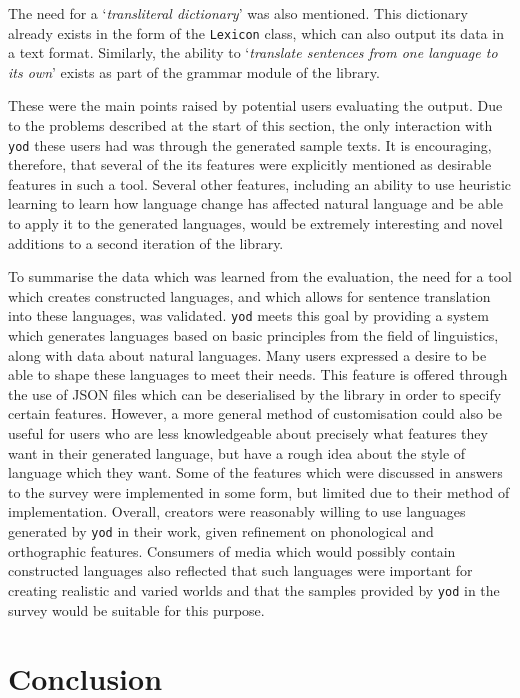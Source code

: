 \documentclass{report}
\begin{document}
	The need for a `\textit{transliteral dictionary}' was also mentioned. This dictionary already exists in the form of the \texttt{Lexicon} class, which can also output its data in a text format. Similarly, the ability to `\textit{translate sentences from one language to its own}' exists as part of the grammar module of the library.
	
	These were the main points raised by potential users evaluating the output. Due to the problems described at the start of this section, the only interaction with \texttt{yod} these users had was through the generated sample texts. It is encouraging, therefore, that several of the its features were explicitly mentioned as desirable features in such a tool. Several other features, including an ability to use heuristic learning to learn how language change has affected natural language and be able to apply it to the generated languages, would be extremely interesting and novel additions to a second iteration of the library.
	
	To summarise the data which was learned from the evaluation, the need for a tool which creates constructed languages, and which allows for sentence translation into these languages, was validated. \texttt{yod} meets this goal by providing a system which generates languages based on basic principles from the field of linguistics, along with data about natural languages. Many users expressed a desire to be able to shape these languages to meet their needs. This feature is offered through the use of JSON files which can be deserialised by the library in order to specify certain features. However, a more general method of customisation could also be useful for users who are less knowledgeable about precisely what features they want in their generated language, but have a rough idea about the style of language which they want. Some of the features which were discussed in answers to the survey were implemented in some form, but limited due to their method of implementation. Overall, creators were reasonably willing to use languages generated by \texttt{yod} in their work, given refinement on phonological and orthographic features. Consumers of media which would possibly contain constructed languages also reflected that such languages were important for creating realistic and varied worlds and that the samples provided by \texttt{yod} in the survey would be suitable for this purpose.
	
	\chapter{Conclusion}
	\label{chapter: conclusion}
	
\end{document}
